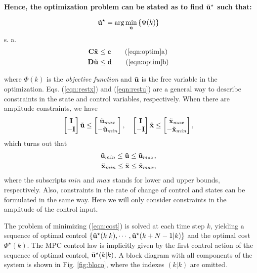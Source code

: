 \documentclass[conference]{IEEEtran} %
\begin{document}
{\bf 
Hence, the optimization problem can be stated as to find $\tilde{\bf
u}^\star$ such that:

\begin{equation}
\label{eqn:optim}
	\tilde{\bf u}^\star = \arg\min_{\tilde{\bf u}}\left\{\Phi(k)\right\}
\end{equation}
\noindent s. a.
\begin{align}
	{\bf C\tilde x} &\leq {\bf c} \label{eqn:restx} \tag{\ref{eqn:optim}a} \\
	{\bf D\tilde u} &\leq {\bf d} \label{eqn:restu} \tag{\ref{eqn:optim}b}
\end{align}

\noindent where $\Phi(k)$ is the {\em objective function} and $\tilde{\bf u}$ is the
free variable in the optimization. Eqs. (\ref{eqn:restx}) and (\ref{eqn:restu}) are a general way to describe constraints in the state and control variables, respectively. When there are amplitude constraints, we have
\begin{equation*}
	\begin{bmatrix} {\bf I} \\ -{\bf I} \end{bmatrix} \tilde{\bf u} \leq \begin{bmatrix} \tilde{\bf u}_{max} \\ -\tilde{\bf u}_{min} \end{bmatrix}, \quad \begin{bmatrix} {\bf I} \\ -{\bf I} \end{bmatrix} \tilde{\bf x} \leq \begin{bmatrix} \tilde{\bf x}_{max} \\ -\tilde{\bf x}_{min} \end{bmatrix},
\end{equation*}
which turns out that
\begin{align*}
	\tilde{\bf u}_{min} \leq \tilde{\bf u} \leq \tilde{\bf u}_{max}, \\
	\tilde{\bf x}_{min} \leq \tilde{\bf x} \leq \tilde{\bf x}_{max},
\end{align*}
where the subscripts $min$ and $max$ stands for lower and upper bounds, respectively. Also, constraints in the rate of change of control and states can be formulated in the same way. Here we will only consider constraints in the amplitude of the control input. }

The problem of minimizing (\ref{eqn:cost}) is solved at each time step $k$,
yielding a sequence of optimal control $\{\tilde{\bf
u}^\star(k|k),\cdots,\tilde{\bf u}^\star(k+N-1|k)\}$ and the optimal cost
$\Phi^\star(k)$. The MPC control law is implicitly given by the first
control action of the sequence of optimal control, $\tilde{\bf u}^\star(k|k)$. A
block diagram with all components of the system is shown in Fig.
\ref{fig:bloco}, where the indexes $(k|k)$ are omitted.
\end{document}
